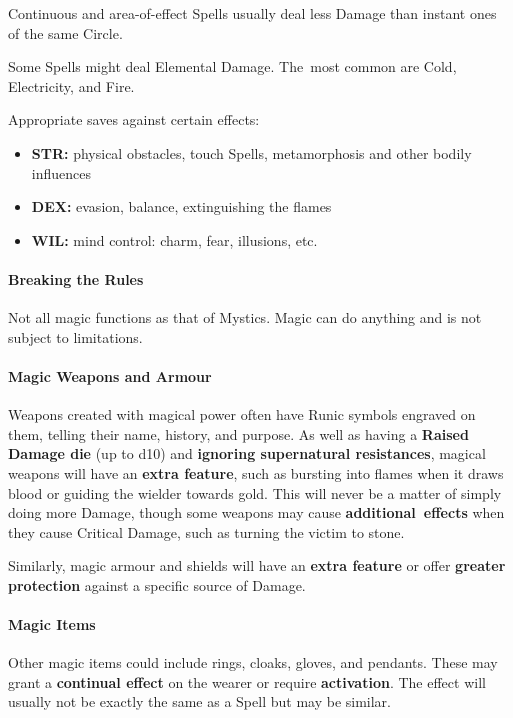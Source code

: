 \documentclass[itdr/core]{subfiles}
\begin{document}
Continuous and area-of-effect Spells usually deal less Damage than instant ones of the same Circle.

Some Spells might deal Elemental Damage. The~most common are Cold, Electricity, and Fire.

Appropriate saves against certain effects:
\begin{itemize}
	\item \textbf{STR:} physical obstacles, touch Spells, metamorphosis and other bodily influences
	\item \textbf{DEX:} evasion, balance, extinguishing the flames
	\item \textbf{WIL:} mind control: charm, fear, illusions, etc.\note
\end{itemize}


\vfill

\paragraph{Breaking the Rules}
Not all magic functions as that of Mystics. Magic can do anything and is not subject to limitations.

\vfill
\break

\paragraph{Magic Weapons and Armour}
Weapons created with magical power often have Runic symbols engraved on them, telling their name, history, and purpose. As well as having a \textbf{Raised Damage die} (up to d10) and \textbf{ignoring supernatural resistances}, magical weapons will have an \textbf{extra feature}, such as bursting into flames when it draws blood or guiding the wielder towards gold. This will never be a matter of simply \mbox{doing} more Damage, though some weapons may cause \mbox{\textbf{additional effects}} when they cause Critical Damage, such as turning the victim to stone.

Similarly, magic armour and shields will have an \textbf{extra feature} or offer \textbf{greater protection} against a specific source of Damage.

\vfill

\paragraph{Magic Items}
Other magic items could include rings, cloaks, gloves, and pendants. These may grant a \textbf{continual effect} on the wearer or require \textbf{activation}. The effect will usually not be exactly the same as a Spell but may be similar.
\end{document}
